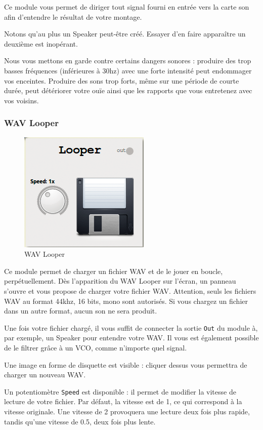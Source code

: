 \documentclass[a4paper,oneside,frenchb,12pt]{article}
\begin{document}
Ce module vous permet de diriger tout signal fourni en entrée vers la
carte son afin d'entendre le résultat de votre montage.

Notons qu'au plus un Speaker peut-être créé. Essayer d'en faire
apparaître un deuxième est inopérant.

Nous vous mettons en garde contre certains dangers sonores : produire
des trop basses fréquences (inférieures à 30hz) avec une forte intensité
peut endommager vos enceintes. Produire des sons trop forts, même sur
une période de courte durée, peut détériorer votre ouïe ainsi que les
rapports que vous entretenez avec vos voisins.

\subsubsection{WAV Looper}

\begin{figure}[h!]
\centering
\includegraphics[scale=0.5]{../img/png/wavlooper.png}
\caption{WAV Looper}
\end{figure}

Ce module permet de charger un fichier WAV et de le jouer en boucle,
perpétuellement. Dès l'apparition du WAV Looper sur l'écran, un panneau
s'ouvre et vous propose de charger votre fichier WAV. Attention, seuls
les fichiers WAV au format 44khz, 16 bits, mono sont autorisés. Si vous
chargez un fichier dans un autre format, aucun son ne sera produit.

Une fois votre fichier chargé, il vous suffit de connecter la sortie
\verb!Out! du module à, par exemple, un Speaker pour entendre votre WAV.
Il vous est également possible de le filtrer grâce à un VCO, comme
n'importe quel signal.

Une image en forme de disquette est visible : cliquer dessus vous
permettra de charger un nouveau WAV.

Un potentiomètre \verb!Speed! est disponible : il permet de modifier la
vitesse de lecture de votre fichier. Par défaut, la vitesse est de 1, ce
qui correspond à la vitesse originale. Une vitesse de 2 provoquera une
lecture deux fois plus rapide, tandis qu'une vitesse de 0.5, deux fois
plus lente.
\end{document}
